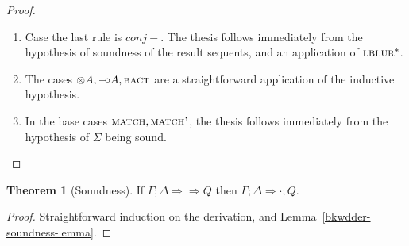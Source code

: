 \documentclass{article}
\theoremstyle{definition}
\newtheorem{theorem}{Theorem}
\def\limp {\mathbin{{-}\mkern-3.5mu{\circ}}}
\newcommand{\bkwseq}[3]{#1 ; #2 \Longrightarrow #3}
\newcommand{\bneuseqsymb}{
  \mathrel{\Longrightarrow\!\!\!\!\!\!\!\!\Longrightarrow}}
\newcommand{\bneuseq}[3]{#1 ; #2 \bneuseqsymb #3}
\newcommand{\bact}{\textsc{bact}}
\newcommand{\matchrule}{\textsc{match}}
\newcommand{\matchprimerule}{\textsc{match'}}
\newcommand{\lblurstar}{\textsc{lblur}^*}
\begin{document}
\begin{proof}
\begin{enumerate}
  \item Case the last rule is $conj-$. The thesis follows immediately from
    the hypothesis of soundness of the result sequents, and an application of
    $\lblurstar$.

  \item The cases $\otimes A, \limp A, \bact$ are a straightforward application
    of the inductive hypothesis.

  \item In the base cases $\matchrule, \matchprimerule$, the thesis follows
    immediately from the hypothesis of $\Sigma$ being sound.

  \end{enumerate}
\end{proof}

\begin{theorem}[Soundness]
  If $\bneuseq{\Gamma}{\Delta}{Q}$ then $\bkwseq{\Gamma}{\Delta}{\cdot ; Q}$.
\end{theorem}
\begin{proof}
  Straightforward induction on the derivation, and
  Lemma~\ref{bkwdder-soundness-lemma}.
\end{proof}
\end{document}
